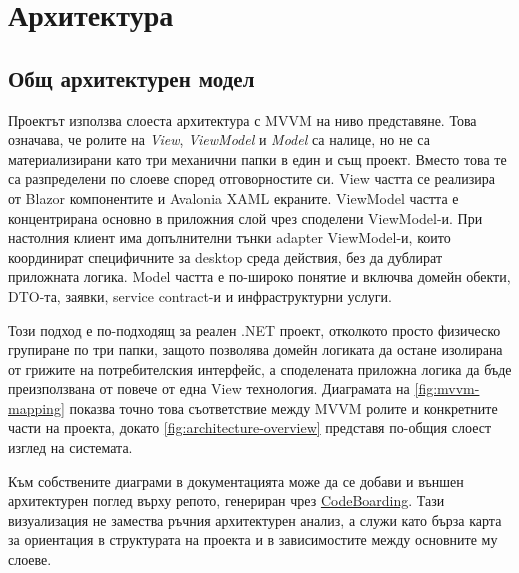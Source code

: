 \chapter{Архитектура}

\section{Общ архитектурен модел}

Проектът използва слоеста архитектура с MVVM на ниво представяне. Това означава, че ролите на \textit{View}, \textit{ViewModel} и \textit{Model} са налице, но не са материализирани като три механични папки в един и същ проект. Вместо това те са разпределени по слоеве според отговорностите си. View частта се реализира от Blazor компонентите и Avalonia XAML екраните. ViewModel частта е концентрирана основно в приложния слой чрез споделени ViewModel-и. При настолния клиент има допълнителни тънки adapter ViewModel-и, които координират специфичните за desktop среда действия, без да дублират приложната логика. Model частта е по-широко понятие и включва домейн обекти, DTO-та, заявки, service contract-и и инфраструктурни услуги.

Този подход е по-подходящ за реален .NET проект, отколкото просто физическо групиране по три папки, защото позволява домейн логиката да остане изолирана от грижите на потребителския интерфейс, а споделената приложна логика да бъде преизползвана от повече от една View технология. Диаграмата на \cref{fig:mvvm-mapping} показва точно това съответствие между MVVM ролите и конкретните части на проекта, докато \cref{fig:architecture-overview} представя по-общия слоест изглед на системата.



Към собствените диаграми в документацията може да се добави и външен архитектурен поглед върху репото, генериран чрез \href{https://github.com/CodeBoarding/CodeBoarding}{CodeBoarding}. Тази визуализация не замества ръчния архитектурен анализ, а служи като бърза карта за ориентация в структурата на проекта и в зависимостите между основните му слоеве.


